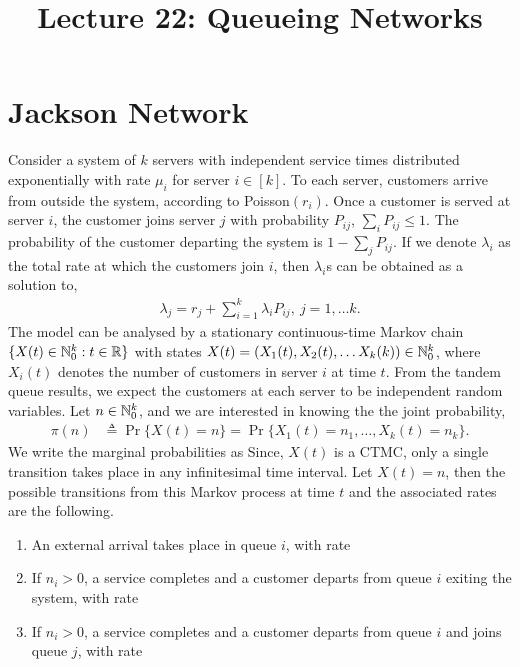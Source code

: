 \documentclass[a4paper,10pt,english]{article}
\title{Lecture 22: Queueing Networks}
\author{}
\begin{document}
\maketitle

\section{Jackson Network}
Consider a system of $k$ servers with independent service times distributed exponentially with rate $\mu_i$ for server $i \in [k]$.  
To each server, customers arrive from outside the system, according to Poisson$(r_i)$. Once a customer is served at server $i$, the customer joins server $j$ with probability $P_{ij}$, $\sum_{i}P_{ij} \leq 1$. The probability of the customer departing the system is $1-\sum_{j}P_{ij}$. If we denote $\lambda_i$ as the total rate at which the customers join $i$, then $\lambda_i$s can be obtained as a solution to,
\begin{align*}
\lambda_j=r_j+\sum_{i=1}^{k}\lambda_i P_{ij},~ j=1, \dots k.
\end{align*}
The model can be analysed by a stationary continuous-time Markov chain $\{X(t) \in \mathbb{N}_0^k: t \in \mathbb{R}\}$ with states $X(t) = (X_1(t),X_2(t), \dots X_k(k)) \in \mathbb{N}_0^k$, 
where $X_i(t)$ denotes the number of customers in server $i$ at time $t$. 
From the tandem queue results, we expect the customers at each server to be independent random variables. 
Let $n \in \mathbb{N}_0^k$, and we are interested in knowing the the joint probability,
\begin{align*}
\pi(n) &\triangleq \Pr\{X(t) = n\} = \Pr\{X_1(t) = n_1, \dots, X_k(t) = n_k\}.
\end{align*}
We write the marginal probabilities as 
Since, $X(t)$ is a CTMC, only a single transition takes place in any infinitesimal time interval. 
Let $X(t) = n$, then the possible transitions from this Markov process at time $t$ and the associated rates are the following.  
\begin{enumerate}[i\_]
\item An external arrival takes place in queue $i$, with rate 
\item If $n_i > 0$, a service completes and a customer departs from queue $i$ exiting the system, with rate 
\item If $n_i > 0$, a service completes and a customer departs from queue $i$ and joins queue $j$, with rate 
\end{enumerate}
\end{document}

